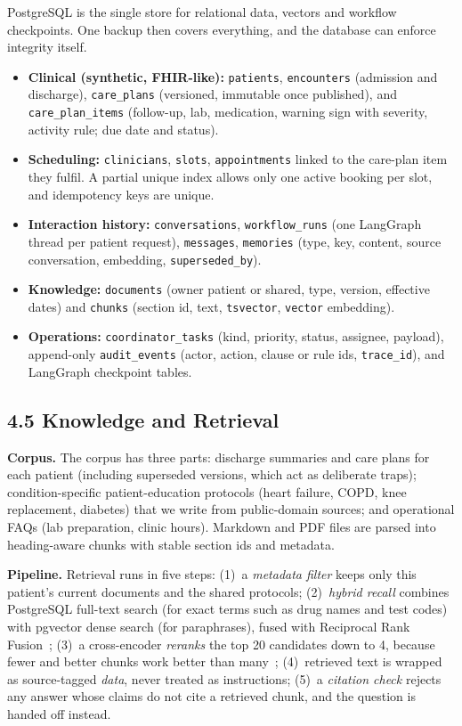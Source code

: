 \documentclass[11pt,a4paper]{article}
\begin{document}
PostgreSQL is the single store for relational data, vectors and workflow checkpoints. One backup then covers everything, and the database can enforce integrity itself.
\begin{itemize}
    \item \textbf{Clinical (synthetic, FHIR-like):} \texttt{patients}, \texttt{encounters} (admission and discharge), \texttt{care\_plans} (versioned, immutable once published), and \linebreak[2]\texttt{care\_plan\_items} (follow-up, lab, medication, warning sign with severity, activity rule; due date and status).
    \item \textbf{Scheduling:} \texttt{clinicians}, \texttt{slots}, \texttt{appointments} linked to the care-plan item they fulfil. A partial unique index allows only one active booking per slot, and idempotency keys are unique.
    \item \textbf{Interaction history:} \texttt{conversations}, \texttt{workflow\_runs} (one LangGraph thread per patient request), \texttt{messages}, \texttt{memories} (type, key, content, source conversation, embedding, \texttt{superseded\_by}).
    \item \textbf{Knowledge:} \texttt{documents} (owner patient or shared, type, version, effective dates) and \texttt{chunks} (section id, text, \texttt{tsvector}, \texttt{vector} embedding).
    \item \textbf{Operations:} \texttt{coordinator\_tasks} (kind, priority, status, assignee, payload), append-only \texttt{audit\_events} (actor, action, clause or rule ids, \texttt{trace\_id}), and LangGraph checkpoint tables.
\end{itemize}

\subsection*{4.5 Knowledge and Retrieval}

\textbf{Corpus.} The corpus has three parts: discharge summaries and care plans for each patient (including superseded versions, which act as deliberate traps); condition-specific patient-education protocols (heart failure, COPD, knee replacement, diabetes) that we write from public-domain sources; and operational FAQs (lab preparation, clinic hours). Markdown and PDF files are parsed into heading-aware chunks with stable section ids and metadata.

\textbf{Pipeline.} Retrieval runs in five steps:
(1)~a \emph{metadata filter} keeps only this patient's current documents and the shared protocols;
(2)~\emph{hybrid recall} combines PostgreSQL full-text search (for exact terms such as drug names and test codes) with pgvector dense search (for paraphrases), fused with Reciprocal Rank Fusion~\cite{rrf};
(3)~a cross-encoder \emph{reranks} the top 20 candidates down to 4, because fewer and better chunks work better than many~\cite{lostmiddle};
(4)~retrieved text is wrapped as source-tagged \emph{data}, never treated as instructions;
(5)~a \emph{citation check} rejects any answer whose claims do not cite a retrieved chunk, and the question is handed off instead.
\end{document}
